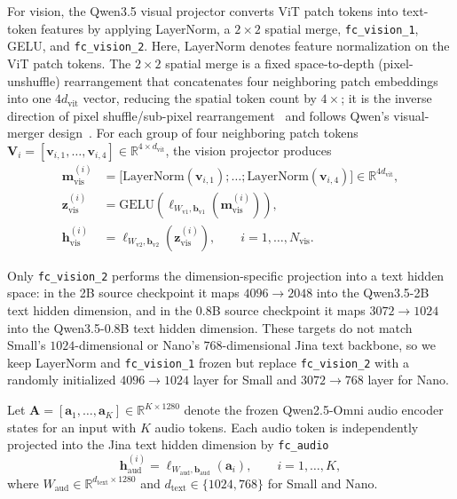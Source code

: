 For vision, the Qwen3.5 visual projector converts ViT patch tokens into text-token features by applying LayerNorm, a $2{\times}2$ spatial merge, \texttt{fc\_vision\_1}, GELU, and \texttt{fc\_vision\_2}.
Here, LayerNorm denotes feature normalization on the ViT patch tokens.
The $2{\times}2$ spatial merge is a fixed space-to-depth (pixel-unshuffle) rearrangement that concatenates four neighboring patch embeddings into one $4d_{\text{vit}}$ vector, reducing the spatial token count by $4\times$; it is the inverse direction of pixel shuffle/sub-pixel rearrangement~\cite{pixel-shuffle} and follows Qwen's visual-merger design~\cite{qwen2-vl,qwen3.5}.
For each group of four neighboring patch tokens $\mathbf{V}_i = [\mathbf{v}_{i,1}, \ldots, \mathbf{v}_{i,4}] \in \mathbb{R}^{4 \times d_{\text{vit}}}$, the vision projector produces
\begin{equation*}
\begin{aligned}
\mathbf{m}^{(i)}_{\text{vis}} &=
\bigl[
\text{LayerNorm}(\mathbf{v}_{i,1});
\ldots;
\text{LayerNorm}(\mathbf{v}_{i,4})
\bigr] \in \mathbb{R}^{4d_{\text{vit}}},\\
\mathbf{z}^{(i)}_{\text{vis}} &=
\text{GELU}\!\left(\ell_{W_{\text{v1}},\mathbf{b}_{\text{v1}}}(\mathbf{m}^{(i)}_{\text{vis}})\right),\\
\mathbf{h}^{(i)}_{\text{vis}} &=
\ell_{W_{\text{v2}},\mathbf{b}_{\text{v2}}}(\mathbf{z}^{(i)}_{\text{vis}}),
\qquad i = 1,\ldots,N_{\text{vis}}.
\end{aligned}
\label{eq:vis_proj}
\end{equation*}

Only \texttt{fc\_vision\_2} performs the dimension-specific projection into a text hidden space: in the 2B source checkpoint it maps $4096{\to}2048$ into the Qwen3.5-2B text hidden dimension, and in the 0.8B source checkpoint it maps $3072{\to}1024$ into the Qwen3.5-0.8B text hidden dimension.
These targets do not match Small's $1024$-dimensional or Nano's $768$-dimensional Jina text backbone, so we keep LayerNorm and \texttt{fc\_vision\_1} frozen but replace \texttt{fc\_vision\_2} with a randomly initialized $4096{\to}1024$ layer for Small and $3072{\to}768$ layer for Nano.

Let $\mathbf{A} = [\mathbf{a}_1, \ldots, \mathbf{a}_K] \in \mathbb{R}^{K \times 1280}$ denote the frozen Qwen2.5-Omni audio encoder states for an input with $K$ audio tokens.
Each audio token is independently projected into the Jina text hidden dimension by \texttt{fc\_audio}
\begin{equation*}
\mathbf{h}^{(i)}_{\text{aud}} =
\ell_{W_{\text{aud}},\mathbf{b}_{\text{aud}}}(\mathbf{a}_i),
\qquad i = 1,\ldots,K,
\label{eq:aud_proj}
\end{equation*}
where $W_{\text{aud}} \in \mathbb{R}^{d_{\text{text}} \times 1280}$ and $d_{\text{text}} \in \{1024,768\}$ for Small and Nano.

